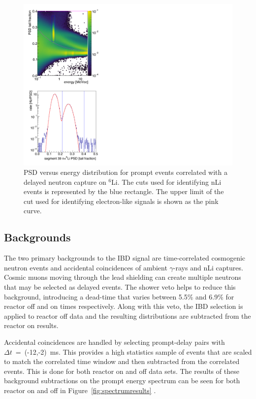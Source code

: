\begin{figure}[h]
	\centering
	\includegraphics[width=0.5\linewidth]{tex/7-oscillation-images/PSDvsE_Corr_nLi}
	\caption{PSD versus energy distribution for prompt events correlated with a delayed neutron capture on $^6$Li. The cuts used for identifying nLi events is represented by the blue rectangle. The upper limit of the cut used for identifying electron-like signals is shown as the pink curve.}
	\label{fig:psdvsecorrnli}
\end{figure}



\subsection{Backgrounds}

The two primary backgrounds to the IBD signal are time-correlated cosmogenic neutron events and accidental coincidences of ambient $\gamma$-rays and nLi captures.
Cosmic muons moving through the lead shielding can create multiple neutrons that may be selected as delayed events.
The shower veto helps to reduce this background, introducing a dead-time that varies between 5.5\% and 6.9\% for reactor off and on times respectively.
Along with this veto, the IBD selection is applied to reactor off data and the resulting distributions are subtracted from the reactor on results.

Accidental coincidences are handled by selecting prompt-delay pairs with \\ \noindent $\Delta t$~=~(-12,-2)~ms.
This provides a high statistics sample of events that are scaled to match the correlated time window and then subtracted from the correlated events. 
This is done for both reactor on and off data sets. 
The results of these background subtractions on the prompt energy spectrum can be seen for both reactor on and off in Figure~\ref{fig:spectrumresults} \cite{Ashenfelter:2018jrx}.

